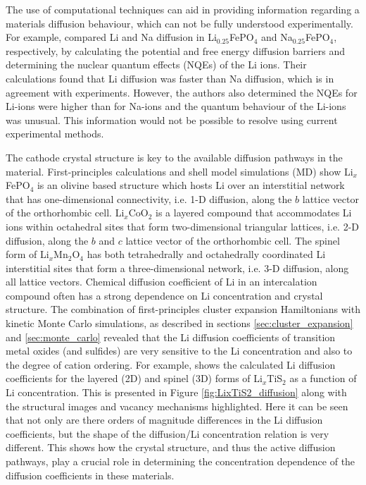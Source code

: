 \documentclass[../main.tex]{subfiles}
\begin{document}
The use of computational techniques can aid in providing information regarding a materials diffusion behaviour, which can not be fully understood experimentally. For example, \citeauthor{dixit2015classical} compared Li and Na diffusion in Li$_{0.25}$FePO$_4$ and Na$_{0.25}$FePO$_4$, respectively, by calculating the potential and free energy diffusion barriers and determining the nuclear quantum effects (NQEs) of the Li ions. \cite{dixit2015classical} Their calculations found that Li diffusion was faster than Na diffusion, which is in agreement with experiments. However, the authors also determined the NQEs for Li-ions were higher than for Na-ions and the quantum behaviour of the Li-ions was unusual. This information would not be possible to resolve using current experimental methods.

The cathode crystal structure is key to the available diffusion pathways in the material. First-principles calculations \cite{Morgan2004,ouyang2004first} and shell model simulations (MD)\cite{islam2005atomic} show Li$_x$FePO$_4$ is an olivine based structure which hosts Li over an interstitial network that has one-dimensional connectivity, i.e. 1-D diffusion, along the $b$ lattice vector of the orthorhombic cell.\cite{amin2006anisotropy} Li$_x$CoO$_2$ is a layered compound that accommodates Li ions within octahedral sites that form two-dimensional triangular lattices, i.e. 2-D diffusion, along the $b$ and $c$ lattice vector of the orthorhombic cell. \cite{van2000lithium} The spinel form of Li$_x$Mn$_2$O$_4$ has both tetrahedrally and octahedrally coordinated Li interstitial sites that form a three-dimensional network, i.e. 3-D diffusion, along all lattice vectors. \cite{thackeray1997manganese,proell20123d} Chemical diffusion coefficient of Li in an intercalation compound often has a strong dependence on Li concentration and crystal structure. The combination of first-principles cluster
expansion Hamiltonians with kinetic Monte Carlo simulations, as described in sections \ref{sec:cluster_expansion} and \ref{sec:monte_carlo} revealed that the Li diffusion coefficients of transition metal oxides (and sulfides) are very sensitive to the Li concentration and also to the degree of cation ordering. \cite{van2008nondilute,van2001first, bhattacharya2011first,bhattacharya2010phase,VanDerVen2013} For example, \citeauthor{VanderVen2020} shows the calculated Li diffusion coefficients for the layered (2D) and spinel (3D) forms of Li$_x$TiS$_2$ as a function of Li concentration. \cite{VanderVen2020,VanDerVen2013,van2008nondilute,bhattacharya2011first} This is presented in Figure \ref{fig:LixTiS2_diffusion} along with the structural images and vacancy mechanisms highlighted. Here it can be seen that not only are there orders of magnitude differences in the Li diffusion coefficients, but the shape of the diffusion/Li concentration relation is very different. This shows how the crystal structure, and thus the active diffusion pathways, play a crucial role in determining the concentration dependence of the diffusion coefficients in these materials.
\end{document}
